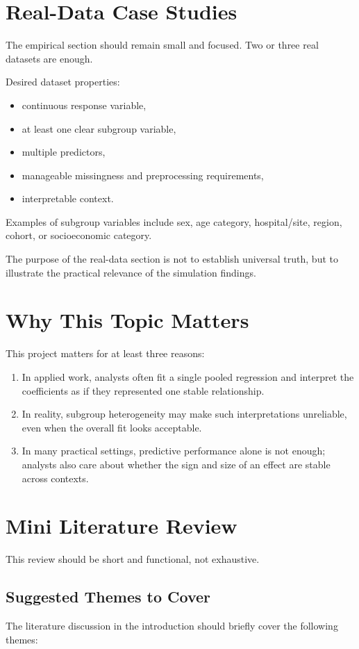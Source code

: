 \documentclass[11pt]{article}
\begin{document}
\section{Real-Data Case Studies}
The empirical section should remain small and focused. Two or three real datasets are enough.

Desired dataset properties:
\begin{itemize}
    \item continuous response variable,
    \item at least one clear subgroup variable,
    \item multiple predictors,
    \item manageable missingness and preprocessing requirements,
    \item interpretable context.
\end{itemize}

Examples of subgroup variables include sex, age category, hospital/site, region, cohort, or socioeconomic category.

The purpose of the real-data section is not to establish universal truth, but to illustrate the practical relevance of the simulation findings.

\section{Why This Topic Matters}
This project matters for at least three reasons:
\begin{enumerate}[label=(\arabic*)]
    \item In applied work, analysts often fit a single pooled regression and interpret the coefficients as if they represented one stable relationship.
    \item In reality, subgroup heterogeneity may make such interpretations unreliable, even when the overall fit looks acceptable.
    \item In many practical settings, predictive performance alone is not enough; analysts also care about whether the sign and size of an effect are stable across contexts.
\end{enumerate}

\section{Mini Literature Review}
This review should be short and functional, not exhaustive.

\subsection{Suggested Themes to Cover}
The literature discussion in the introduction should briefly cover the following themes:
\end{document}
